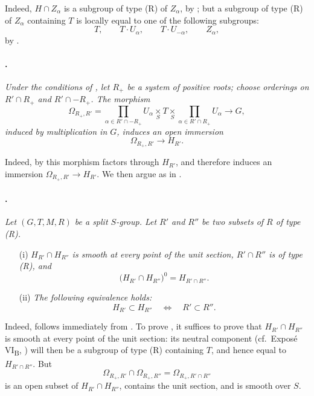 Indeed, \(H\cap Z_\alpha\) is a subgroup of type \textup{(R)} of
\(Z_\alpha\), by ; but a subgroup of type \textup{(R)} of
\(Z_\alpha\) containing \(T\) is locally equal to one of the
following subgroups:
\[
  T,\qquad T\cdot U_\alpha,\qquad
  T\cdot U_{-\alpha},\qquad Z_\alpha,
\]
by .

\paragraph{.}
\textit{Under the conditions of , let \(R_+\) be a system of
positive roots; choose orderings on \(R'\cap R_+\) and
\(R'\cap -R_+\). The morphism}
\[
  \Omega_{R_+,R'}
  =
  \prod_{\alpha\in R'\cap -R_+}U_\alpha
  \mathop{\times}\limits_S T
  \mathop{\times}\limits_S
  \prod_{\alpha\in R'\cap R_+}U_\alpha
  \longrightarrow G,
\]
\textit{induced by multiplication in \(G\), induces an open
immersion}
\[
  \Omega_{R_+,R'}\longrightarrow H_{R'}.
\]

Indeed, by  this morphism factors through \(H_{R'}\), and
therefore induces an immersion
\(\Omega_{R_+,R'}\to H_{R'}\). We then argue as in .

\paragraph{.}
\textit{Let \((G,T,M,R)\) be a split \(S\)-group. Let \(R'\) and
\(R''\) be two subsets of \(R\) of type \textup{(R)}.}
\begin{enumerate}
  \item[\textup{\SGAInlineRefTarget{sga3:xxii:prop:5.4.5:item:i}(i)}]
  \textit{\(H_{R'}\cap H_{R''}\) is smooth at every point of the
  unit section, \(R'\cap R''\) is of type \textup{(R)}, and}
  \[
    \bigl(H_{R'}\cap H_{R''}\bigr)^0
    =
    H_{R'\cap R''}.
  \]

  \item[\textup{\SGAInlineRefTarget{sga3:xxii:prop:5.4.5:item:ii}(ii)}]
  \textit{The following equivalence holds:}
  \[
    H_{R'}\subset H_{R''}
    \quad\Longleftrightarrow\quad
    R'\subset R''.
  \]
\end{enumerate}

Indeed, \textup{} follows immediately from \textup{}. To
prove \textup{}, it suffices to prove that
\(H_{R'}\cap H_{R''}\) is smooth at every point of the unit section:
its neutral component \textup{(cf.\ Exposé
VI\textsubscript{B}, )} will then be a subgroup of type
\textup{(R)} containing \(T\), and hence equal to
\(H_{R'\cap R''}\). But
\[
  \Omega_{R_+,R'}\cap\Omega_{R_+,R''}
  =
  \Omega_{R_+,R'\cap R''}
\]
is an open subset of \(H_{R'}\cap H_{R''}\), contains the unit
section, and is smooth over \(S\).

